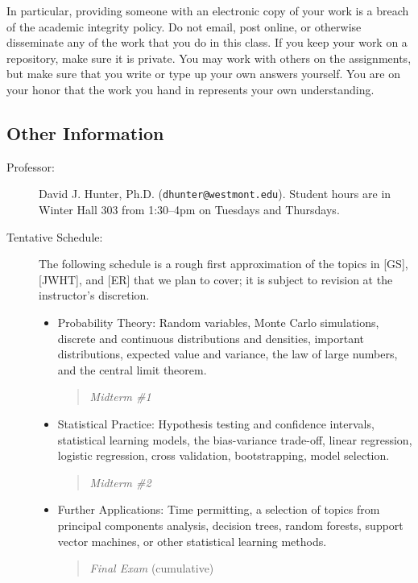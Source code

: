 \documentclass[
  twoside]{article}
\begin{document}
In particular, providing someone with an electronic copy of your work is
a breach of the academic integrity policy. Do not email, post online, or
otherwise disseminate any of the work that you do in this class. If you
keep your work on a repository, make sure it is private. You may work
with others on the assignments, but make sure that you write or type up
your own answers yourself. You are on your honor that the work you hand
in represents your own understanding.

\clearpage

\hypertarget{other-information}{%
\subsection{Other Information}\label{other-information}}

\begin{description} 

\item[Professor:] David J. Hunter, Ph.D.
  (\verb!dhunter@westmont.edu!). Student hours are in Winter Hall 303 
  from 1:30--4pm on Tuesdays and Thursdays.

 \item[Tentative Schedule:] The following schedule is a rough first approximation of the topics in [GS], [JWHT], and [ER] that we plan to cover; it is subject to revision at the instructor's discretion. 
  \begin{itemize}
      \item Probability Theory: Random variables, Monte Carlo simulations, discrete and continuous distributions and densities, important distributions, expected value and variance, the law of large numbers, and the central limit theorem.
   \begin{quote}
    \textit{Midterm \#1}     
   \end{quote}
      \item Statistical Practice: Hypothesis testing and confidence intervals, statistical learning models, the bias-variance trade-off, linear regression, logistic regression, cross validation, bootstrapping, model selection. 
   \begin{quote}
    \textit{Midterm \#2}  
   \end{quote}
      \item Further Applications: Time permitting, a selection of topics from principal components analysis, decision trees, random forests, support vector machines, or other statistical learning methods.
   \begin{quote}
    \textit{Final Exam}     (cumulative)
   \end{quote}
  \end{itemize}


\end{description}
\end{document}
